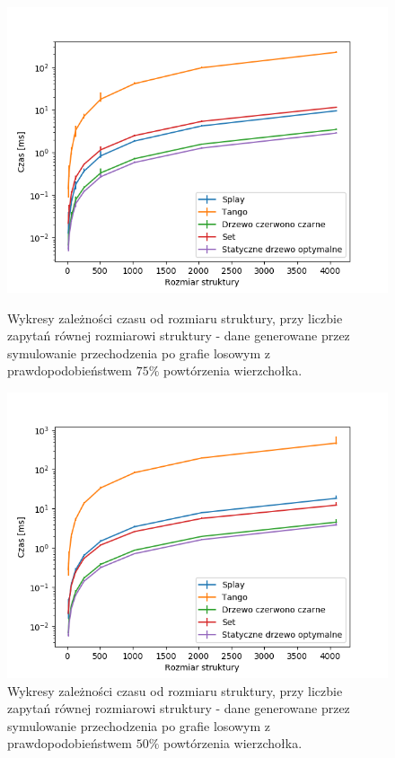 \documentclass[declaration,shortabstract]{iithesis}
\theoremstyle{thm}
\theoremstyle{remark}
\theoremstyle{plain}
\theoremstyle{plain}
\theoremstyle{plain}
\begin{document}
\begin{figure}[ht]
\begin{minipage}[b]{.45\textwidth}
\centering
\includegraphics[width=1\textwidth]{wykresy/randwalk25_main.png}
\caption{Wykresy zależności czasu od rozmiaru struktury, przy liczbie zapytań równej rozmiarowi struktury - dane generowane przez symulowanie przechodzenia po grafie losowym z prawdopodobieństwem  \(75\%\) powtórzenia wierzchołka.}
\end{minipage}
\hfill
\begin{minipage}[b]{.45\textwidth}
\centering
\includegraphics[width=1\textwidth]{wykresy/randwalk50_main.png}
\caption{Wykresy zależności czasu od rozmiaru struktury, przy liczbie zapytań równej rozmiarowi struktury - dane generowane przez symulowanie przechodzenia po grafie losowym z prawdopodobieństwem  \(50\%\) powtórzenia wierzchołka.}
\end{minipage}
\end{figure}
\end{document}
